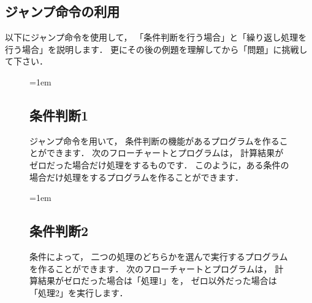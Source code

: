 \subsection{ジャンプ命令の利用}

以下にジャンプ命令を使用して，
「条件判断を行う場合」と「繰り返し処理を行う場合」を説明します．
更にその後の例題を理解してから「問題」に挑戦して下さい．

\begin{figure}[btp]
  \begin{framed}{\parindent=1em
      \subsection*{条件判断1}
      ジャンプ命令を用いて，
      条件判断の機能があるプログラムを作ることができます．
      次のフローチャートとプログラムは，
      計算結果がゼロだった場合だけ処理をするものです．
      このように，ある条件の場合だけ処理をするプログラムを作ることができます．

      \begin{center}
      \end{center}
  }\end{framed}
\end{figure}

\begin{figure}[btp]
  \begin{framed}{\parindent=1em
      \subsection*{条件判断2}
      条件によって，
      二つの処理のどちらかを選んで実行するプログラムを作ることができます．
      次のフローチャートとプログラムは，
      計算結果がゼロだった場合は「処理1」を，
      ゼロ以外だった場合は「処理2」を実行します．

      \begin{center}
      \end{center}
  }\end{framed}
\end{figure}

